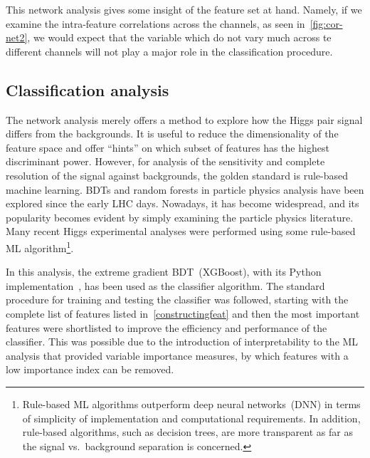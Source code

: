 This network analysis gives some insight of the feature set at hand. Namely, if we examine the intra-feature correlations across the channels, as seen in~\autoref{fig:cor-net2}, we would expect that the variable which do not vary much across te different channels will not play a major role in the classification procedure. 
\subsection{Classification analysis }
\par The network analysis merely offers a method to explore how the Higgs pair signal differs from the backgrounds. It is useful to reduce the dimensionality of the feature space and offer ``hints'' on which subset of features has the highest discriminant power. However, for analysis of the sensitivity and complete resolution of the signal against backgrounds, the golden standard is rule-based machine learning. 
BDTs and random forests in particle physics analysis have been explored since the early LHC days. Nowadays, it has become widespread, and its popularity becomes evident by simply examining the particle physics literature. Many recent Higgs experimental analyses were performed using some rule-based ML algorithm\footnote{Rule-based ML algorithms outperform deep neural networks~(DNN) in terms of simplicity of implementation and computational requirements. In addition, rule-based algorithms, such as decision trees, are more transparent as far as the signal vs.~background separation is concerned.}.
\par In this analysis, the extreme gradient BDT~(XGBoost), with its Python implementation~\cite{10.1145/2939672.2939785}, has been used as the classifier algorithm. The standard procedure for training and testing the classifier was followed, starting with the complete list of features listed in~\autoref{constructingfeat} and then the most important features were shortlisted to improve the efficiency and performance of the classifier. This was possible due to the introduction of interpretability to the ML analysis that provided variable importance measures, by which features with a low importance index can be removed. 
